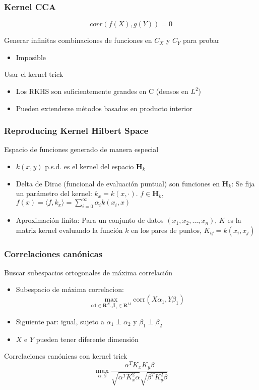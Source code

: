 \documentclass[t,9pt,pdftex]{beamer}
\begin{document}
\begin{frame}[c]
	\frametitle{Kernel CCA}
	$$corr(f(X), g(Y))=0$$
	\begin{block}{Generar infinitas combinaciones de funciones en $C_X$ y $C_Y$ para probar}
		\begin{itemize}
		\item Imposible
		\end{itemize}
	\end{block}	
	\begin{exampleblock}{Usar el kernel trick}
		\begin{itemize}
		\item Los RKHS son suficientemente grandes en C (densos en $L^2$)
		\item Pueden extenderse m\'etodos basados en producto interior
		\end{itemize}
	\end{exampleblock}
\end{frame}

\begin{frame}[c]
	\frametitle{Reproducing Kernel Hilbert Space}
	\begin{block}{Espacio de funciones generado de manera especial}
		\begin{itemize}
		\item $k(x,y)$ p.s.d. es el kernel del espacio $\mathbf{H}_k$
		\item Delta de Dirac (funcional de evaluaci\'on puntual) son funciones en $\mathbf{H}_k$: Se fija un par\'ametro del kernel: $k_x = k(x,\cdot)$. $f \in \mathbf{H}_k$, $f(x) = \langle f, k_x \rangle = \sum_{i=0}^{\infty}{\alpha_i k(x_i, x)}$
		\item Aproximaci\'on finita: Para un conjunto de datos $(x_1, x_2, \ldots, x_n)$, $K$ es la matriz kernel evaluando la funci\'on $k$ en los pares de puntos, $K_{ij} = k(x_i,x_j)$
		\end{itemize}
	\end{block}
\end{frame}

\begin{frame}[c]
	\frametitle{Correlaciones can\'onicas}
	\begin{block}{Buscar subespacios ortogonales de m\'axima correlaci\'on}
		\begin{itemize}
		\item Subespacio de m\'axima correlacion: $$\max_{\alpha1\in\mathbf{R}^N, \beta_1\in\mathbf{R}^M}{\mbox{corr}(X\alpha_1, Y\beta_1)}$$
		\item Siguiente par: igual, sujeto a $\alpha_1 \perp \alpha_2$ y $\beta_1 \perp \beta_2$
		\item $X$ e $Y$ pueden tener diferente dimensi\'on
		\end{itemize}
	\end{block}	
	\begin{block}{Correlaciones can\'onicas con kernel trick}
		$$
		\max_{\alpha, \beta} \frac{\alpha^T K_x K_y \beta}{\sqrt{\alpha^T K_x^2 \alpha} \sqrt{\beta^T K_y^2 \beta}}
		$$
	\end{block}
\end{frame}
\end{document}
